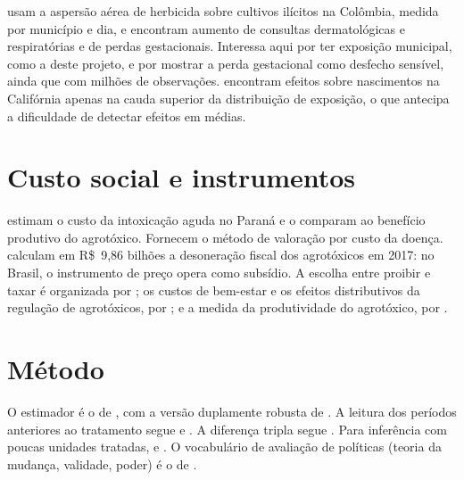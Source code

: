  usam a aspersão aérea de herbicida sobre cultivos
ilícitos na Colômbia, medida por município e dia, e encontram aumento de
consultas dermatológicas e respiratórias e de perdas gestacionais. Interessa
aqui por ter exposição municipal, como a deste projeto, e por mostrar a perda
gestacional como desfecho sensível, ainda que com milhões de observações.  encontram
efeitos sobre nascimentos na Califórnia apenas na cauda superior da
distribuição de exposição, o que antecipa a dificuldade de detectar efeitos em
médias.

\section{Custo social e instrumentos}

 estimam o custo da intoxicação
aguda no Paraná e o comparam ao benefício produtivo do agrotóxico. Fornecem o
método de valoração por custo da doença.  calculam
em R\$~9,86 bilhões a desoneração fiscal dos agrotóxicos em 2017: no Brasil, o
instrumento de preço opera como subsídio. A escolha entre proibir e taxar é
organizada por ; os custos de bem-estar e os efeitos
distributivos da regulação de agrotóxicos, por ; e a
medida da produtividade do agrotóxico, por .

\section{Método}

O estimador é o de , com a versão duplamente
robusta de . A leitura dos períodos anteriores ao
tratamento segue  e . A
diferença tripla segue . Para inferência com poucas
unidades tratadas,  e . O vocabulário de
avaliação de políticas (teoria da mudança, validade, poder) é o de
.

